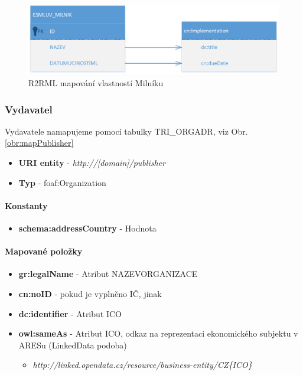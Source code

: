 \begin{figure}[H]
\centerline{\includegraphics[width=\textwidth]{img/mapMilestone.eps}}
\caption{R2RML mapování vlastností Milníku}
\label{obr:mapMilestone}
\end{figure}

\subsubsection{Vydavatel}

Vydavatele namapujeme pomocí tabulky TRI\_ORGADR, viz Obr. \ref{obr:mapPublisher}

\begin{itemize}
\item \textbf{URI entity}  - \textit{http://[domain]/publisher}
\item \textbf{Typ} - foaf:Organization
\end{itemize}

\paragraph*{Konstanty}
\begin{itemize}
\item \textbf{schema:addressCountry} - Hodnota 
\end{itemize}

\paragraph*{Mapované položky}
\begin{itemize}
\item \textbf{gr:legalName} - Atribut NAZEVORGANIZACE
\item \textbf{cn:noID} -  pokud je vyplněno IČ, jinak 
\item \textbf{dc:identifier} - Atribut ICO
\item \textbf{owl:sameAs} - Atribut ICO, odkaz na reprezentaci ekonomického subjektu v ARESu (LinkedData podoba)
	\begin{itemize}
	\item \textit{http://linked.opendata.cz/resource/business-entity/CZ\{ICO\}}
	\end{itemize}
\end{itemize}

